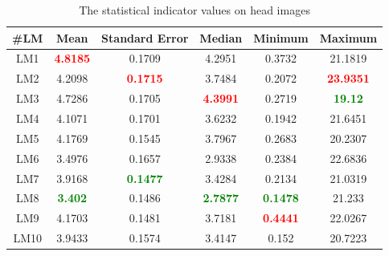 \documentclass[review]{elsarticle}
\begin{document}
\begin{table}[htbp]
\begin{tabular}{ | c | c | c | c | c | c | }
\hline
	\textbf{\#LM} & \textbf{Mean} & \textbf{Standard Error} & \textbf{Median} & \textbf{Minimum} & \textbf{Maximum} \\ \hline
	LM1 & \textcolor{red}{\textbf{4.8185}} & 0.1709 & 4.2951 & 0.3732 & 21.1819 \\ \hline
	LM2 & 4.2098 & \textcolor{red}{\textbf{0.1715}} & 3.7484 & 0.2072 & \textcolor{red}{\textbf{23.9351}} \\ \hline
	LM3 & 4.7286 & 0.1705 & \textcolor{red}{\textbf{4.3991}} & 0.2719 & \textcolor{green}{\textbf{19.12}} \\ \hline
	LM4 & 4.1071 & 0.1701 & 3.6232 & 0.1942 & 21.6451 \\ \hline
	LM5 & 4.1769 & 0.1545 & 3.7967 & 0.2683 & 20.2307 \\ \hline
	LM6 & 3.4976 & 0.1657 & 2.9338 & 0.2384 & 22.6836 \\ \hline
	LM7 & 3.9168 & \textcolor{green}{\textbf{0.1477}} & 3.4284 & 0.2134 & 21.0319 \\ \hline
	LM8 & \textcolor{green}{\textbf{3.402}} & 0.1486 & \textcolor{green}{\textbf{2.7877}} & \textcolor{green}{\textbf{0.1478}} & 21.233 \\ \hline
	LM9 & 4.1703 & 0.1481 & 3.7181 & \textcolor{red}{\textbf{0.4441}} & 22.0267 \\ \hline
	LM10 & 3.9433 & 0.1574 & 3.4147 & 0.152 & 20.7223 \\ \hline
\end{tabular}
\caption{The statistical indicator values on head images}
\label{a2}
\end{table}
\end{document}

